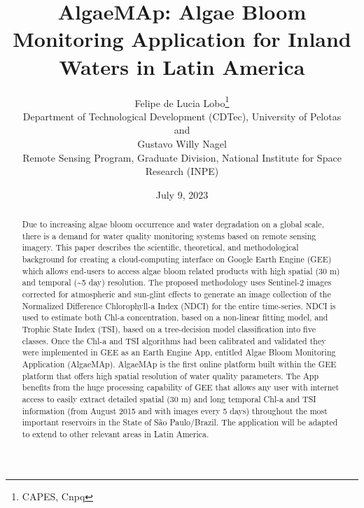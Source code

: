\documentclass[
  12pt]{article}
\begin{document}
\def\spacingset#1{\renewcommand{\baselinestretch}%
{#1}\small\normalsize} \spacingset{1}



\date{July 9, 2023}
\title{\bf AlgaeMAp: Algae Bloom Monitoring Application for Inland
Waters in Latin America}
\author{
Felipe de Lucia Lobo\thanks{CAPES, Cnpq}\\
Department of Technological Development (CDTec), University of Pelotas\\
and\\Gustavo Willy Nagel\\
Remote Sensing Program, Graduate Division, National Institute for Space
Research (INPE)\\
}
\maketitle

\bigskip
\bigskip
\begin{abstract}
Due to increasing algae bloom occurrence and water degradation on a
global scale, there is a demand for water quality monitoring systems
based on remote sensing imagery. This paper describes the scientific,
theoretical, and methodological background for creating a
cloud-computing interface on Google Earth Engine (GEE) which allows
end-users to access algae bloom related products with high spatial (30
m) and temporal (\textasciitilde5 day) resolution. The proposed
methodology uses Sentinel-2 images corrected for atmospheric and
sun-glint effects to generate an image collection of the Normalized
Difference Chlorophyll-a Index (NDCI) for the entire time-series. NDCI
is used to estimate both Chl-a concentration, based on a non-linear
fitting model, and Trophic State Index (TSI), based on a tree-decision
model classification into five classes. Once the Chl-a and TSI
algorithms had been calibrated and validated they were implemented in
GEE as an Earth Engine App, entitled Algae Bloom Monitoring Application
(AlgaeMAp). AlgaeMAp is the first online platform built within the GEE
platform that offers high spatial resolution of water quality
parameters. The App benefits from the huge processing capability of GEE
that allows any user with internet access to easily extract detailed
spatial (30 m) and long temporal Chl-a and TSI information (from August
2015 and with images every 5 days) throughout the most important
reservoirs in the State of São Paulo/Brazil. The application will be
adapted to extend to other relevant areas in Latin America.
\end{abstract}
\end{document}
